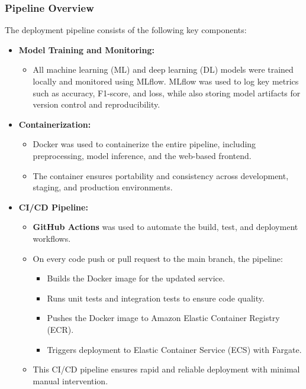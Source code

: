 \documentclass[10pt,twocolumn,letterpaper]{article}
\begin{document}
\subsubsection{Pipeline Overview}

The deployment pipeline consists of the following key components:
\begin{itemize}
    \item \textbf{Model Training and Monitoring:}
        \begin{itemize}
            \item All machine learning (ML) and deep learning (DL) models were trained locally and monitored using MLflow. MLflow was used to log key metrics such as accuracy, F1-score, and loss, while also storing model artifacts for version control and reproducibility.
        \end{itemize}
    \item \textbf{Containerization:}
        \begin{itemize}
            \item Docker was used to containerize the entire pipeline, including preprocessing, model inference, and the web-based frontend.
            \item The container ensures portability and consistency across development, staging, and production environments.
        \end{itemize}
    \item \textbf{CI/CD Pipeline:}
        \begin{itemize}
            \item \textbf{GitHub Actions} was used to automate the build, test, and deployment workflows.
            \item On every code push or pull request to the main branch, the pipeline:
                \begin{itemize}
                    \item Builds the Docker image for the updated service.
                    \item Runs unit tests and integration tests to ensure code quality.
                    \item Pushes the Docker image to Amazon Elastic Container Registry (ECR).
                    \item Triggers deployment to Elastic Container Service (ECS) with Fargate.
                \end{itemize}
            \item This CI/CD pipeline ensures rapid and reliable deployment with minimal manual intervention.

\end{itemize}
\end{itemize}
\end{document}
